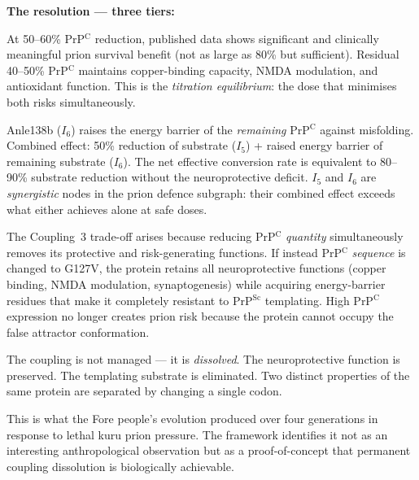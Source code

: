 \documentclass[12pt,a4paper]{article}
\newcommand{\prpc}{PrP$^{\mathrm{C}}$}
\newcommand{\prpsc}{PrP$^{\mathrm{Sc}}$}
\newcommand{\Inet}[1]{$I_{#1}$}
\begin{document}
\textbf{The resolution --- three tiers:}

\begin{description}[leftmargin=2em, itemsep=0.5em]
  \item[\textbf{Tier~A --- Partial dosing (50--60\%):}]
    At 50--60\% \prpc{} reduction, published data shows significant and
    clinically meaningful prion survival benefit (not as large as 80\% but
    sufficient). Residual 40--50\% \prpc{} maintains copper-binding
    capacity, NMDA modulation, and antioxidant function. This is the
    \textit{titration equilibrium}: the dose that minimises both risks
    simultaneously.

  \item[\textbf{Tier~B --- \Inet{6} synergy:}]
    Anle138b (\Inet{6}) raises the energy barrier of the
    \textit{remaining} \prpc{} against misfolding. Combined effect: 50\%
    reduction of substrate (\Inet{5}) + raised energy barrier of remaining
    substrate (\Inet{6}). The net effective conversion rate is equivalent to
    80--90\% substrate reduction without the neuroprotective deficit. \Inet{5}
    and \Inet{6} are \textit{synergistic} nodes in the prion defence
    subgraph: their combined effect exceeds what either achieves alone at
    safe doses.

  \item[\textbf{Tier~C --- G127V base editing (Synthetic Fore Strategy,
    permanent dissolution):}]
    The Coupling~3 trade-off arises because reducing \prpc{}
    \textit{quantity} simultaneously removes its protective and
    risk-generating functions. If instead \prpc{} \textit{sequence} is
    changed to G127V, the protein retains all neuroprotective functions
    (copper binding, NMDA modulation, synaptogenesis) while acquiring
    energy-barrier residues that make it completely resistant to \prpsc{}
    templating. High \prpc{} expression no longer creates prion risk because
    the protein cannot occupy the false attractor conformation.

    The coupling is not managed --- it is \textit{dissolved}. The
    neuroprotective function is preserved. The templating substrate is
    eliminated. Two distinct properties of the same protein are separated
    by changing a single codon.

    This is what the Fore people's evolution produced over four generations
    in response to lethal kuru prion pressure. The framework identifies it
    not as an interesting anthropological observation but as a
    proof-of-concept that permanent coupling dissolution is biologically
    achievable.
\end{description}
\end{document}
